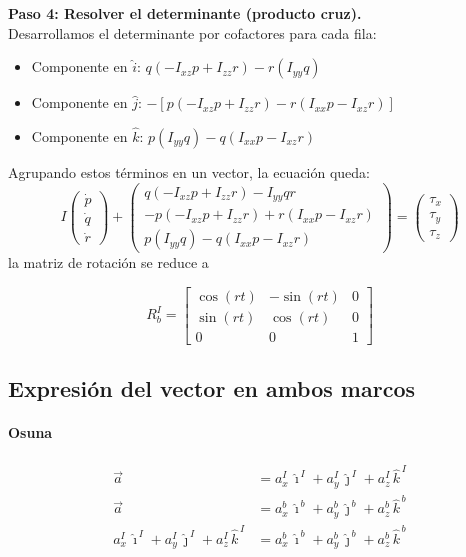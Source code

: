 \documentclass[11pt,a4paper]{article}
\begin{document}
\vspace{0.3cm}
\textbf{Paso 4: Resolver el determinante (producto cruz).} \\
Desarrollamos el determinante por cofactores para cada fila:
\begin{itemize}
    \item Componente en $\hat{i}$: $q(-I_{xz}p + I_{zz}r) - r(I_{yy}q)$
    \item Componente en $\hat{j}$: $- [p(-I_{xz}p + I_{zz}r) - r(I_{xx}p - I_{xz}r)]$
    \item Componente en $\hat{k}$: $p(I_{yy}q) - q(I_{xx}p - I_{xz}r)$
\end{itemize}
Agrupando estos términos en un vector, la ecuación queda:
\begin{equation*}
    I \begin{pmatrix} \dot{p} \\ \dot{q} \\ \dot{r} \end{pmatrix} +
    \begin{pmatrix}
    q(-I_{xz}p + I_{zz}r) - I_{yy}qr \\
    -p(-I_{xz}p + I_{zz}r) + r(I_{xx}p - I_{xz}r) \\
    p(I_{yy}q) - q(I_{xx}p - I_{xz}r)
    \end{pmatrix} = \begin{pmatrix} \tau_x \\ \tau_y \\ \tau_z \end{pmatrix}
\end{equation*}
la matriz de rotación se reduce a

\begin{equation}
\boxed{
R_b^I
=
\begin{bmatrix}
\cos(rt) & -\sin(rt) & 0\\
\sin(rt) &  \cos(rt) & 0\\
0        & 0         & 1
\end{bmatrix}
}
\end{equation}




\subsection*{Expresión del vector en ambos marcos}
\paragraph{Osuna}
\begin{align}
  \vec{a} &= a_x^{I}\,\hat{\imath}^{\,I} + a_y^{I}\,\hat{\jmath}^{\,I} + a_z^{I}\,\hat{k}^{\,I} \\[4pt]
  \vec{a} &= a_x^{b}\,\hat{\imath}^{\,b} + a_y^{b}\,\hat{\jmath}^{\,b} + a_z^{b}\,\hat{k}^{\,b} \\[4pt]
  a_x^{I}\,\hat{\imath}^{\,I} + a_y^{I}\,\hat{\jmath}^{\,I} + a_z^{I}\,\hat{k}^{\,I}
  &= a_x^{b}\,\hat{\imath}^{\,b} + a_y^{b}\,\hat{\jmath}^{\,b} + a_z^{b}\,\hat{k}^{\,b}
\end{align}
\end{document}
